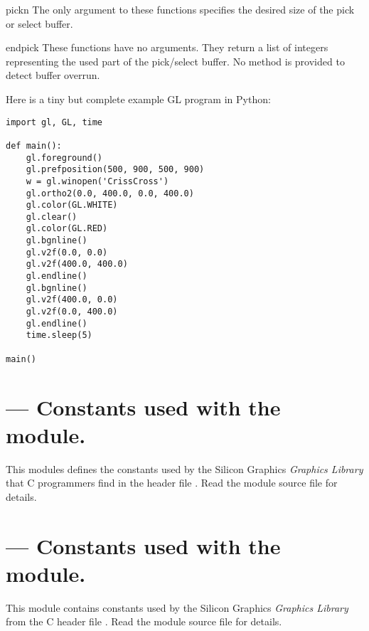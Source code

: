 \begin{funcdesc}{pick}{n}
The only argument to these functions specifies the desired size of the
pick or select buffer.
\end{funcdesc}

\begin{funcdesc}{endpick}{}
These functions have no arguments.
They return a list of integers representing the used part of the
pick/select buffer.
No method is provided to detect buffer overrun.
\end{funcdesc}

Here is a tiny but complete example GL program in Python:

\begin{verbatim}
import gl, GL, time

def main():
    gl.foreground()
    gl.prefposition(500, 900, 500, 900)
    w = gl.winopen('CrissCross')
    gl.ortho2(0.0, 400.0, 0.0, 400.0)
    gl.color(GL.WHITE)
    gl.clear()
    gl.color(GL.RED)
    gl.bgnline()
    gl.v2f(0.0, 0.0)
    gl.v2f(400.0, 400.0)
    gl.endline()
    gl.bgnline()
    gl.v2f(400.0, 0.0)
    gl.v2f(0.0, 400.0)
    gl.endline()
    time.sleep(5)

main()
\end{verbatim}
%
\section{ ---
         Constants used with the  module.}


This modules defines the constants used by the Silicon Graphics
\emph{Graphics Library} that C programmers find in the header file
.
Read the module source file for details.


\section{ ---
         Constants used with the  module.}


This module contains constants used by the Silicon Graphics
\emph{Graphics Library} from the C header file .
Read the module source file for details.
